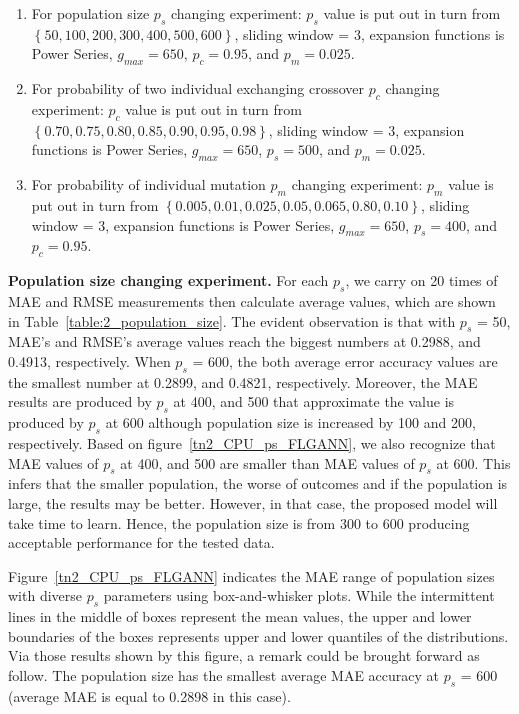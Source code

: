 \documentclass[conference]{IEEEtran}
\begin{document}
\begin{enumerate}
	\item For population size $p_s$ changing experiment: $p_s$ value is put out in turn from $\left\{50, 100, 200, 300, 400, 500, 600\right\}$, sliding window = 3, expansion functions is Power Series, $g_{max} = 650$, $p_c = 0.95$, and $p_m = 0.025$.	
	\item For probability of two individual exchanging crossover $p_c$ changing experiment: $p_c$ value is put out in turn from $\left\{ 0.70, 0.75, 0.80, 0.85, 0.90, 0.95, 0.98 \right\}$, sliding window = 3, expansion functions is Power Series, $g_{max} = 650$, $p_s = 500$, and $p_m = 0.025$.
	\item For probability of individual mutation $p_m$ changing experiment: $p_m$ value is put out in turn from $\left\{ 0.005, 0.01, 0.025, 0.05, 0.065, 0.80, 0.10 \right\}$, sliding window = 3, expansion functions is Power Series, $g_{max} = 650$, $p_s = 400$, and $p_c = 0.95$.
\end{enumerate}

\textbf{Population size changing experiment.} For each $p_s$, we carry on 20 times of MAE and RMSE measurements then calculate average values, which are shown in Table~\ref{table:2_population_size}. The evident observation is that with $p_s$ = 50, MAE's and RMSE's average values reach the biggest numbers at 0.2988, and 0.4913, respectively. When $p_s$ = 600, the both average error accuracy values are the smallest number at 0.2899, and 0.4821, respectively. Moreover, the MAE results are produced by $p_s$ at 400, and 500 that approximate the value is produced by $p_s$ at 600 although population size is increased by 100 and 200, respectively. Based on figure~\ref{tn2_CPU_ps_FLGANN}, we also recognize that MAE values of $p_s$ at 400, and 500 are smaller than MAE values of $p_s$ at 600. This infers that the smaller population, the worse of outcomes and if the population is large, the results may be better. However, in that case, the proposed model will take time to learn. Hence, the population size is from 300 to 600 producing acceptable performance for the tested data.

Figure~\ref{tn2_CPU_ps_FLGANN} indicates the MAE range of population sizes with diverse $p_s$ parameters using box-and-whisker plots. While the intermittent lines in the middle of boxes represent the mean values, the upper and lower boundaries of the boxes represents upper and lower quantiles of the distributions. Via those results shown by this figure, a remark could be brought forward as follow. The population size has the smallest average MAE accuracy at $p_s$ = 600 (average MAE is equal to 0.2898 in this case).
\end{document}
